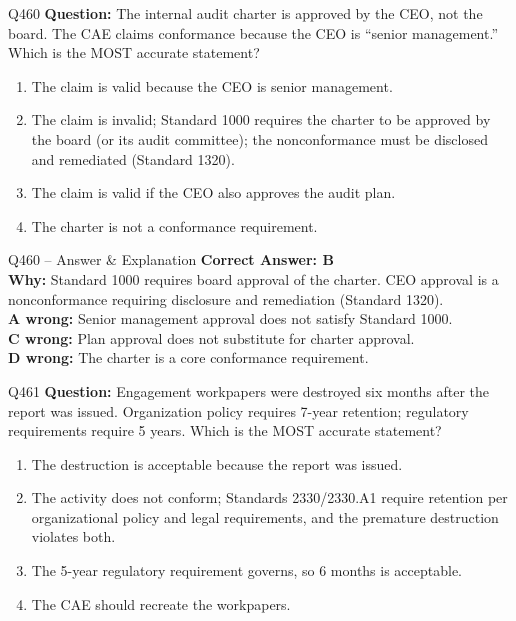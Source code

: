 \documentclass[aspectratio=169,10pt]{beamer}
\begin{document}
	\begin{frame}[t]{Q460}
		\small
		\textbf{Question:} The internal audit charter is approved by the CEO, not the board. The CAE claims conformance because the CEO is ``senior management.'' Which is the MOST accurate statement?
		\begin{enumerate}[label=\Alph*.,itemsep=1pt,topsep=2pt]
			\item The claim is valid because the CEO is senior management.
			\item The claim is invalid; Standard 1000 requires the charter to be approved by the board (or its audit committee); the nonconformance must be disclosed and remediated (Standard 1320).
			\item The claim is valid if the CEO also approves the audit plan.
			\item The charter is not a conformance requirement.
		\end{enumerate}
	\end{frame}
	
	\begin{frame}[t]{Q460 -- Answer \& Explanation}
		\small
		\textbf{Correct Answer: B} \\[4pt]
		\textbf{Why:} Standard 1000 requires board approval of the charter. CEO approval is a nonconformance requiring disclosure and remediation (Standard 1320). \\[4pt]
		\textbf{A wrong:} Senior management approval does not satisfy Standard 1000. \\[2pt]
		\textbf{C wrong:} Plan approval does not substitute for charter approval. \\[2pt]
		\textbf{D wrong:} The charter is a core conformance requirement.
	\end{frame}
	
	\begin{frame}[t]{Q461}
		\small
		\textbf{Question:} Engagement workpapers were destroyed six months after the report was issued. Organization policy requires 7-year retention; regulatory requirements require 5 years. Which is the MOST accurate statement?
		\begin{enumerate}[label=\Alph*.,itemsep=1pt,topsep=2pt]
			\item The destruction is acceptable because the report was issued.
			\item The activity does not conform; Standards 2330/2330.A1 require retention per organizational policy and legal requirements, and the premature destruction violates both.
			\item The 5-year regulatory requirement governs, so 6 months is acceptable.
			\item The CAE should recreate the workpapers.
		\end{enumerate}
	\end{frame}
	
\end{document}
